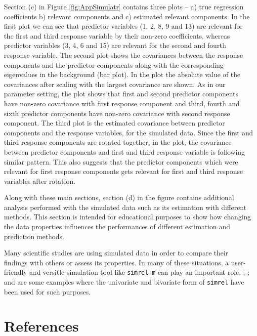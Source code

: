 \documentclass[3p,times,12pt,authoryear]{elsarticle}
\theoremstyle{definition}
\theoremstyle{definition}
\theoremstyle{remark}
\begin{document}
Section (c) in Figure \ref{fig:AppSimulatr} contains three plots -- a)
true regression coefficients b) relevant components and c) estimated
relevant components. In the first plot we can see that predictor
variables (1, 2, 8, 9 and 13) are relevant for the first and third
response variable by their non-zero coefficients, whereas predictor
variables (3, 4, 6 and 15) are relevant for the second and fourth
response variable. The second plot shows the covariances between the
response components and the predictor components along with the
corresponding eigenvalues in the background (bar plot). In the plot the
absolute value of the covariances after scaling with the largest
covariance are shown. As in our parameter setting, the plot shows that
first and second predictor components have non-zero covariance with
first response component and third, fourth and sixth predictor
components have non-zero covariance with second response component. The
third plot is the estimated covariance between predictor components and
the response variables, for the simulated data. Since the first and
third response components are rotated together, in the plot, the
covariance between predictor components and first and third response
variable is following similar pattern. This also suggests that the
predictor components which were relevant for first response components
gets relevant for first and third response variables after rotation.

Along with these main sections, section (d) in the figure contains
additional analysis performed with the simulated data such as its
estimation with different methods. This section is intended for
educational purposes to show how changing the data properties influences
the performances of different estimation and prediction methods.

Many scientific studies
\citep{helland2012near, saebo2008lpls, cook2015simultaneous} are using
simulated data in order to compare their findings with others or assess
its properties. In many of these situations, a user-friendly and
versitle simulation tool like \texttt{simrel-m} can play an important
role. \citet{gangsei2016theoretical}; \citet{gangsei2016linear}; and
\citet{saebo2015simrel} are some examples where the univariate and
bivariate form of \texttt{simrel} have been used for such purposes.

\section{References}\label{references}


\renewcommand\refname{References}

\end{document}
